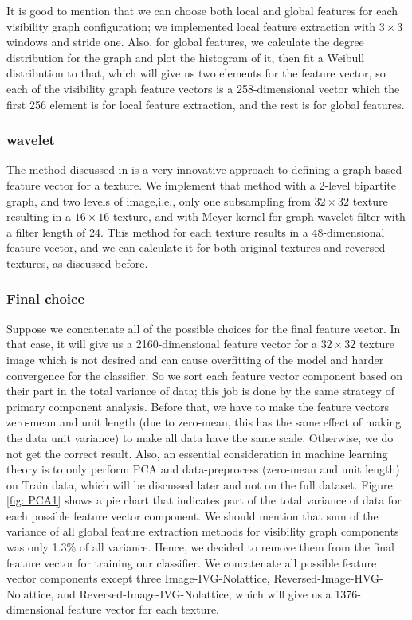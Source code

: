\documentclass[conference]{IEEEtran}
\begin{document}
It is good to mention that we can choose both local and global features for each visibility graph configuration; we implemented local feature extraction with $3\times3$ windows and stride one. Also, for global features, we calculate the degree distribution for the graph and plot the histogram of it, then fit a Weibull distribution to that, which will give us two elements for the feature vector, so each of the visibility graph feature vectors is a 258-dimensional vector which the first 256 element is for local feature extraction, and the rest is for global features.

\subsubsection{\textbf{wavelet}}
The method discussed in \cite{wavelet} is a very innovative approach to defining a graph-based feature vector for a texture. We implement that method with a 2-level bipartite graph, and two levels of image,i.e., only one subsampling from $32\times32$ texture resulting in a $16\times16$ texture, and with Meyer kernel for graph wavelet filter with a filter length of 24.
This method for each texture results in a 48-dimensional feature vector, and we can calculate it for both original textures and reversed textures, as discussed before. 


\subsubsection*{\textbf{Final choice}}
Suppose we concatenate all of the possible choices for the final feature vector. In that case, it will give us a 2160-dimensional feature vector for a $32\times32$ texture image which is not desired and can cause overfitting of the model and harder convergence for the classifier. So we sort each feature vector component based on their part in the total variance of data; this job is done by the same strategy of primary component analysis. Before that, we have to make the feature vectors zero-mean and unit length (due to zero-mean, this has the same effect of making the data unit variance) to make all data have the same scale. Otherwise, we do not get the correct result. Also, an essential consideration in machine learning theory is to only perform PCA and data-preprocess (zero-mean and unit length) on Train data, which will be discussed later and not on the full dataset.
Figure \ref{fig: PCA1} shows a pie chart that indicates part of the total variance of data for each possible feature vector component. We should mention that sum of the variance of all global feature extraction methods for visibility graph components was only 1.3\% of all variance. Hence, we decided to remove them from the final feature vector for training our classifier. We concatenate all possible feature vector components except three\: Image-IVG-Nolattice, Reversed-Image-HVG-Nolattice, and Reversed-Image-IVG-Nolattice, which will give us a 1376-dimensional feature vector for each texture.
\end{document}
